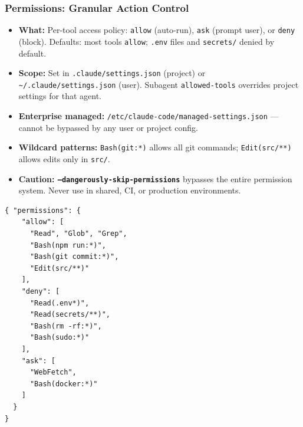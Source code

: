 \begin{frame}[fragile]\frametitle{Permissions: Granular Action Control}
  \begin{itemize}
    \item \textbf{What:} Per-tool access policy: \texttt{allow} (auto-run), \texttt{ask} (prompt user), or \texttt{deny} (block). Defaults: most tools \texttt{allow}; \texttt{.env} files and \texttt{secrets/} denied by default.
    \item \textbf{Scope:} Set in \texttt{.claude/settings.json} (project) or \texttt{\textasciitilde/.claude/settings.json} (user). Subagent \texttt{allowed-tools} overrides project settings for that agent.
    \item \textbf{Enterprise managed:} \texttt{/etc/claude-code/managed-settings.json} --- cannot be bypassed by any user or project config.
    \item \textbf{Wildcard patterns:} \texttt{Bash(git:*)} allows all git commands; \texttt{Edit(src/**)} allows edits only in \texttt{src/}.
    \item \textbf{Caution: \texttt{--dangerously-skip-permissions}} bypasses the entire permission system. Never use in shared, CI, or production environments.
  \end{itemize}

\begin{lstlisting}
{ "permissions": {
    "allow": [
      "Read", "Glob", "Grep",
      "Bash(npm run:*)",
      "Bash(git commit:*)",
      "Edit(src/**)"
    ],
    "deny": [
      "Read(.env*)",
      "Read(secrets/**)",
      "Bash(rm -rf:*)",
      "Bash(sudo:*)"
    ],
    "ask": [
      "WebFetch",
      "Bash(docker:*)"
    ]
  }
}
\end{lstlisting}
\end{frame}


